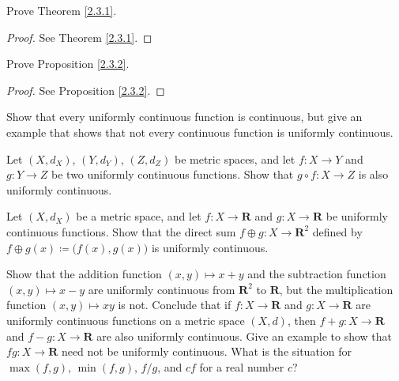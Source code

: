 \exercisesection

\begin{exercise}\label{ex 2.3.1}
    Prove Theorem \ref{2.3.1}.
\end{exercise}

\begin{proof}
    See Theorem \ref{2.3.1}.
\end{proof}

\begin{exercise}\label{ex 2.3.2}
    Prove Proposition \ref{2.3.2}.
\end{exercise}

\begin{proof}
    See Proposition \ref{2.3.2}.
\end{proof}

\begin{exercise}\label{ex 2.3.3}
    Show that every uniformly continuous function is continuous, but give an example that shows that not every continuous function is uniformly continuous.
\end{exercise}

\begin{exercise}\label{ex 2.3.4}
    Let \((X, d_X)\), \((Y, d_Y)\), \((Z, d_Z)\) be metric spaces, and let \(f : X \to Y\) and \(g : Y \to Z\) be two uniformly continuous functions.
    Show that \(g \circ f : X \to Z\) is also uniformly continuous.
\end{exercise}

\begin{exercise}\label{ex 2.3.5}
    Let \((X, d_X)\) be a metric space, and let \(f : X \to \mathbf{R}\) and \(g : X \to \mathbf{R}\) be uniformly continuous functions.
    Show that the direct sum \(f \oplus g : X \to \mathbf{R}^2\) defined by \(f \oplus g(x) \coloneqq \big(f(x), g(x)\big)\) is uniformly continuous.
\end{exercise}

\begin{exercise}\label{ex 2.3.6}
    Show that the addition function \((x, y) \mapsto x + y\) and the subtraction function \((x, y) \mapsto x - y\) are uniformly continuous from \(\mathbf{R}^2\) to \(\mathbf{R}\), but the multiplication function \((x, y) \mapsto xy\) is not.
    Conclude that if \(f : X \to \mathbf{R}\) and \(g : X \to \mathbf{R}\) are uniformly continuous functions on a metric space \((X, d)\), then \(f + g : X \to \mathbf{R}\) and \(f - g : X \to \mathbf{R}\) are also uniformly continuous.
    Give an example to show that \(fg : X \to \mathbf{R}\) need not be uniformly continuous.
    What is the situation for \(\max(f, g)\), \(\min(f, g)\), \(f / g\), and \(cf\) for a real number \(c\)?
\end{exercise}